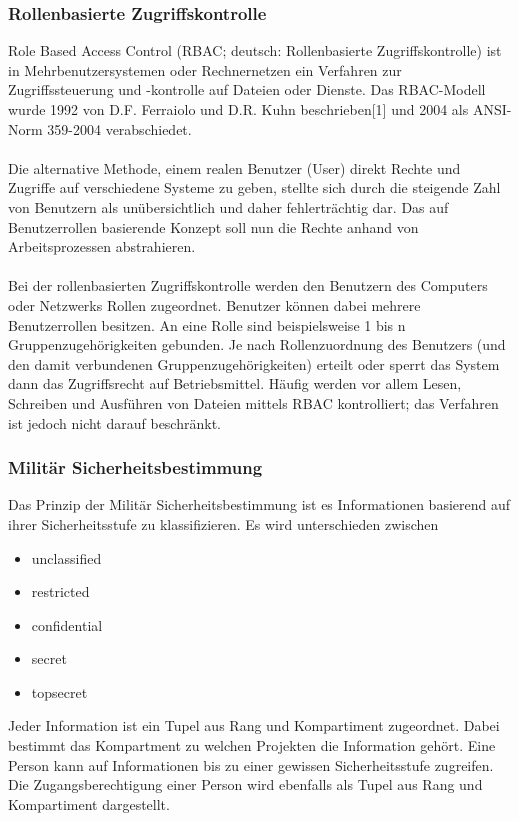 \subsubsection{Rollenbasierte Zugriffskontrolle}
Role Based Access Control (RBAC; deutsch: Rollenbasierte Zugriffskontrolle) ist in Mehrbenutzersystemen oder Rechnernetzen ein Verfahren zur Zugriffssteuerung und -kontrolle auf Dateien oder Dienste. Das RBAC-Modell wurde 1992 von D.F. Ferraiolo und D.R. Kuhn beschrieben[1] und 2004 als ANSI-Norm 359-2004 verabschiedet.
\\\\
Die alternative Methode, einem realen Benutzer (User) direkt Rechte und Zugriffe auf verschiedene Systeme zu geben, stellte sich durch die steigende Zahl von Benutzern als unübersichtlich und daher fehlerträchtig dar. Das auf Benutzerrollen basierende Konzept soll nun die Rechte anhand von Arbeitsprozessen abstrahieren.
\\\\
Bei der rollenbasierten Zugriffskontrolle werden den Benutzern des Computers oder Netzwerks Rollen zugeordnet. Benutzer können dabei mehrere Benutzerrollen besitzen. An eine Rolle sind beispielsweise 1 bis n Gruppenzugehörigkeiten gebunden. Je nach Rollenzuordnung des Benutzers (und den damit verbundenen Gruppenzugehörigkeiten) erteilt oder sperrt das System dann das Zugriffsrecht auf Betriebsmittel. Häufig werden vor allem Lesen, Schreiben und Ausführen von Dateien mittels RBAC kontrolliert; das Verfahren ist jedoch nicht darauf beschränkt.

\subsubsection{Militär Sicherheitsbestimmung}
Das Prinzip der Militär Sicherheitsbestimmung ist es Informationen basierend auf ihrer Sicherheitsstufe zu klassifizieren. Es wird unterschieden zwischen
\begin{itemize}
\item unclassified
\item restricted
\item confidential
\item secret 
\item topsecret
\end{itemize} 
Jeder Information ist ein Tupel aus Rang und Kompartiment zugeordnet. Dabei bestimmt das Kompartment zu welchen Projekten die Information gehört. 
Eine Person kann auf Informationen bis zu einer gewissen Sicherheitsstufe zugreifen. Die Zugangsberechtigung einer Person wird ebenfalls als Tupel aus Rang und Kompartiment dargestellt.   
